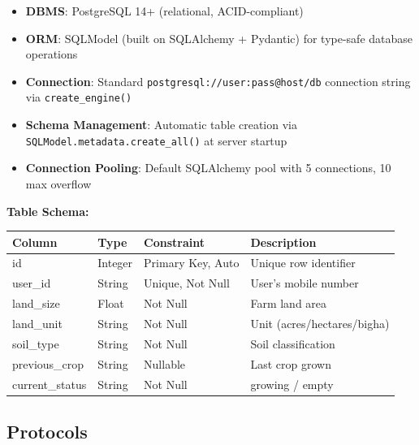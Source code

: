 \documentclass[12pt,a4paper]{article}
\newcommand{\tablefont}{\fontsize{10}{12}\selectfont}
\begin{document}
\begin{itemize}
    \item \textbf{DBMS}: PostgreSQL 14+ (relational, ACID-compliant)
    \item \textbf{ORM}: SQLModel (built on SQLAlchemy + Pydantic) for type-safe database operations
    \item \textbf{Connection}: Standard \texttt{postgresql://user:pass@host/db} connection string via \texttt{create\_engine()}
    \item \textbf{Schema Management}: Automatic table creation via \texttt{SQLModel.metadata.create\_all()} at server startup
    \item \textbf{Connection Pooling}: Default SQLAlchemy pool with 5 connections, 10 max overflow
\end{itemize}

\textbf{Table Schema:}

{\tablefont
\begin{tabular}{|l|l|l|p{4.5cm}|}
\hline
\textbf{Column} & \textbf{Type} & \textbf{Constraint} & \textbf{Description} \\
\hline
id & Integer & Primary Key, Auto & Unique row identifier \\
user\_id & String & Unique, Not Null & User's mobile number \\
land\_size & Float & Not Null & Farm land area \\
land\_unit & String & Not Null & Unit (acres/hectares/bigha) \\
soil\_type & String & Not Null & Soil classification \\
previous\_crop & String & Nullable & Last crop grown \\
current\_status & String & Not Null & growing / empty \\
\hline
\end{tabular}
}

\subsection{Protocols}
\end{document}
